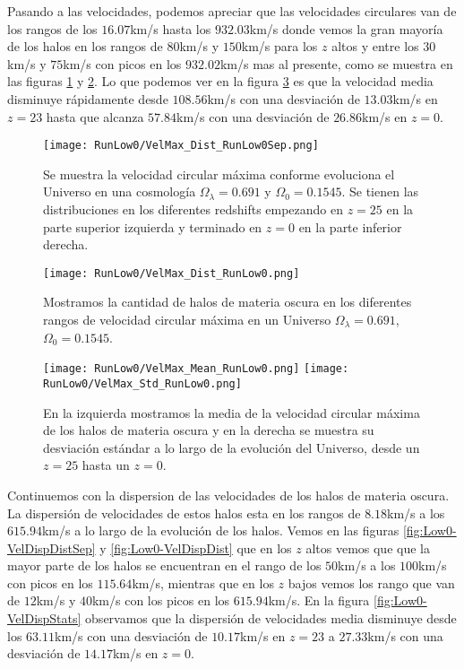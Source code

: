Pasando a las velocidades, podemos apreciar que las velocidades circulares van de los rangos de los $16.07$km/s hasta los $932.03$km/s donde vemos la gran mayoría de los halos en los rangos de $80$km/s y $150$km/s para los $z$ altos y entre los $30$km/s y $75$km/s con picos en los $932.02$km/s mas al presente, como se muestra en las figuras \ref{fig:Low0-VelMaxDistSep} y \ref{fig:Low0-VelMaxDist}. Lo que podemos ver en la figura \ref{fig:Low0-VelMaxStats} es que la velocidad media disminuye rápidamente desde $108.56$km/s con una desviación de $13.03$km/s en $z=23$ hasta que alcanza $57.84$km/s con una desviación de $26.86$km/s en $z=0$.

\begin{figure}[H]
    \centering
    \texttt{[image: RunLow0/VelMax\_Dist\_RunLow0Sep.png]}
    \caption[Velocidad circular máxima]{\footnotesize Se muestra la velocidad circular máxima conforme evoluciona el Universo en una cosmología $\Omega_\lambda = 0.691$ y $\Omega_0 = 0.1545$. Se tienen las distribuciones en los diferentes redshifts empezando en $z=25$ en la parte superior izquierda y terminado en $z=0$ en la parte inferior derecha.}
    \label{fig:Low0-VelMaxDistSep}
\end{figure}

\begin{figure}[H]
    \centering
    \texttt{[image: RunLow0/VelMax\_Dist\_RunLow0.png]}
    \caption[Distribución de la velocidad circular máxima]{\footnotesize Mostramos la cantidad de halos de materia oscura en los diferentes rangos de velocidad circular máxima en un Universo $\Omega_\lambda = 0.691$, $\Omega_0 = 0.1545$.}
    \label{fig:Low0-VelMaxDist}
\end{figure}

\begin{figure}[H]
    \centering
    \texttt{[image: RunLow0/VelMax\_Mean\_RunLow0.png]}
    \texttt{[image: RunLow0/VelMax\_Std\_RunLow0.png]}
    \caption[Media y desviación estándar de la velocidad circular máxima]{\footnotesize En la izquierda mostramos la media de la velocidad circular máxima de los halos de materia oscura y en la derecha se muestra su desviación estándar a lo largo de la evolución del Universo, desde un $z=25$ hasta un $z=0$.}
    \label{fig:Low0-VelMaxStats}
\end{figure}

Continuemos con la dispersion de las velocidades de los halos de materia oscura. La dispersión de velocidades de estos halos esta en los rangos de $8.18$km/s a los $615.94$km/s a lo largo de la evolución de los halos. Vemos en las figuras \ref{fig:Low0-VelDispDistSep} y \ref{fig:Low0-VelDispDist} que en los $z$ altos vemos que que la mayor parte de los halos se encuentran en el rango de los $50$km/s a los $100$km/s con picos en los $115.64$km/s, mientras que en los $z$ bajos vemos los rango que van de $12$km/s y $40$km/s con los picos en los $615.94$km/s. En la figura \ref{fig:Low0-VelDispStats} observamos que la dispersión de velocidades media disminuye desde los $63.11$km/s con una desviación de $10.17$km/s en $z=23$ a $27.33$km/s con una desviación de $14.17$km/s en $z=0$.

